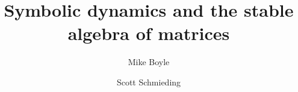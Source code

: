 \documentclass{amsart}
\theoremstyle{definition}
\theoremstyle{definition}
\numberwithin{equation}{subsection}
\begin{document}

\title[Symbolic dynamics and stable algebra]{Symbolic dynamics and the stable algebra of
  matrices}




\author[M. Boyle]{Mike Boyle}


\address{Department of Mathematics, University of Maryland, College
Park, MD 20742-4015, USA
}



\author[S. Schmieding]{Scott Schmieding}
\address{Department of Mathematics, 
Pennsylvania State University, 
State College, PA 16802, USA}














\end{document}
